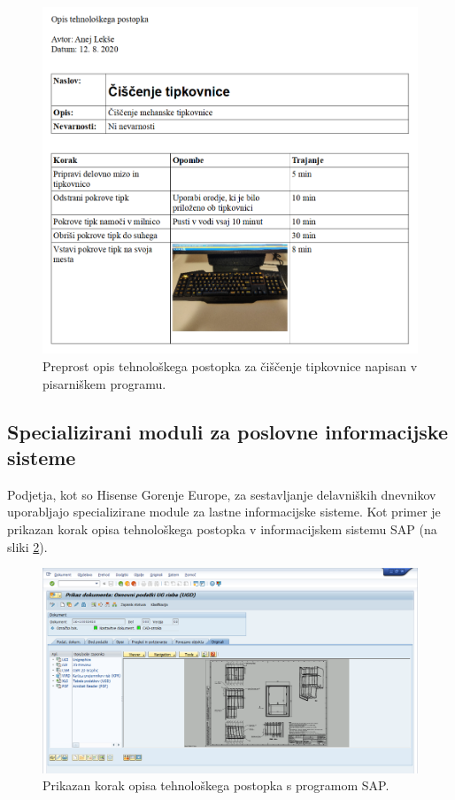 \documentclass[a4paper, 12pt]{book}
\begin{document}
\begin{figure}[H]
\begin{center}
\includegraphics[width=13.5cm]{report_writer}
\end{center}
\caption{Preprost opis tehnološkega postopka za čiščenje tipkovnice napisan v pisarniškem programu.}
\label{report_writer}
\end{figure}



\subsection{Specializirani moduli za poslovne informacijske sisteme}

Podjetja, kot so Hisense Gorenje Europe, za sestavljanje delavniških dnevnikov uporabljajo specializirane module za lastne informacijske sisteme.
Kot primer je prikazan korak opisa tehnološkega postopka v informacijskem sistemu SAP (na sliki \ref{sap_1}).

\begin{figure}[H]
\begin{center}
\includegraphics[width=13cm]{sap_1}
\end{center}
\caption{Prikazan korak opisa tehnološkega postopka s programom SAP.}
\label{sap_1}
\end{figure}
\end{document}

